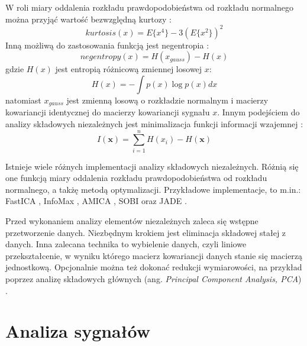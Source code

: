 \documentclass[notitlepage]{report}
\begin{document}
W roli miary oddalenia rozkładu prawdopodobieństwa od rozkładu normalnego można przyjąć wartość bezwzględną kurtozy \cite{oja}:
\begin{equation}
kurtosis(x) = E\{x^4\} - 3(E\{x^2\})^2
\end{equation}
Inną możliwą do zastosowania funkcją jest negentropia \cite{oja} \cite{langlois}:
\begin{equation}
negentropy(x) = H(x_{gauss}) - H(x)
\end{equation}
gdzie $H(x)$ jest entropią różnicową zmiennej losowej $x$:
\begin{equation}
H(x) = -\int p(x)\log p(x)dx
\end{equation}
natomiast $x_{gauss}$ jest zmienną losową o rozkładzie normalnym i macierzy kowariancji identycznej do macierzy kowariancji sygnału $x$. Innym podejściem do analizy składowych niezależnych jest minimalizacja funkcji informacji wzajemnej  \cite{oja} \cite{langlois}:
\begin{equation}
I(\mathbf{x}) = \sum_{i=1}^{n}H(x_i)-H(\mathbf{x})
\end{equation}

Istnieje wiele różnych implementacji analizy składowych niezależnych. Różnią się one funkcją miary oddalenia rozkładu prawdopodobieństwa od rozkładu normalnego, a takżę metodą optymalizacji. Przykładowe implementacje, to m.in.: FastICA \cite{oja}, InfoMax \cite{langlois}, AMICA \cite{palmer}, SOBI oraz JADE \cite{sahonero}.

Przed wykonaniem analizy elementów niezależnych zaleca się wstępne przetworzenie danych. Niezbędnym krokiem jest eliminacja składowej stałej z danych. Inna zalecana technika to wybielenie danych, czyli liniowe przekształcenie, w wyniku którego macierz kowariancji danych stanie się macierzą jednostkową. Opcjonalnie można też dokonać redukcji wymiarowości, na przykład poprzez analizę składowych głównych (ang. \textit{Principal Component Analysis, PCA}) \cite{oja}.

\chapter{Analiza sygnałów}
\end{document}
